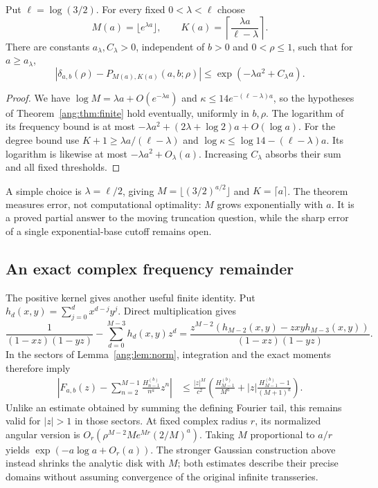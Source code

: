 \begin{theorem}
\label{ang:thm:gaussian}
Put $\ell=\log(3/2)$. For every fixed $0<\lambda<\ell$ choose
\begin{equation}
 M(a)=\lfloor e^{\lambda a}\rfloor,\qquad
 K(a)=\left\lceil\frac{\lambda a}{\ell-\lambda}\right\rceil.
 \label{ang:eq:moving-choice}
\end{equation}
There are constants $a_\lambda,C_\lambda>0$, independent of
$b>0$ and $0<\rho\le1$, such that for $a\ge a_\lambda$,
\begin{equation}
 |\delta_{a,b}(\rho)-P_{M(a),K(a)}(a,b;\rho)|
 \le \exp(-\lambda a^2+C_\lambda a).
 \label{ang:eq:gaussian}
\end{equation}
\end{theorem}
\begin{proof}
We have $\log M=\lambda a+O(e^{-\lambda a})$ and
$\kappa\le14e^{-(\ell-\lambda)a}$, so the hypotheses of
Theorem~\ref{ang:thm:finite} hold eventually, uniformly in
$b,\rho$. The logarithm of its frequency bound is at most
$-\lambda a^2+(2\lambda+\log2)a+O(\log a)$.
For the degree bound use
$K+1\ge\lambda a/(\ell-\lambda)$ and
$\log\kappa\le\log14-(\ell-\lambda)a$.
Its logarithm is likewise at most $-\lambda a^2+O_\lambda(a)$.
Increasing $C_\lambda$ absorbs their sum and all fixed thresholds.
\end{proof}

A simple choice is $\lambda=\ell/2$, giving
$M=\lfloor(3/2)^{a/2}\rfloor$ and $K=\lceil a\rceil$.
The theorem measures error, not computational optimality: $M$ grows
exponentially with $a$. It is a proved partial answer to the moving
truncation question, while the sharp error of a single
exponential-base cutoff remains open.

\subsection{An exact complex frequency remainder}

The positive kernel gives another useful finite identity. Put
$h_d(x,y)=\sum_{j=0}^d x^{d-j}y^j$. Direct multiplication gives
\begin{equation}
 \frac1{(1-xz)(1-yz)}-\sum_{d=0}^{M-3}h_d(x,y)z^d
 =\frac{z^{M-2}(h_{M-2}(x,y)-zxyh_{M-3}(x,y))}
 {(1-xz)(1-yz)}.
 \label{ang:eq:exact-tail}
\end{equation}
In the sectors of Lemma~\ref{ang:lem:norm}, integration and the
exact moments therefore imply
\begin{align}
 \left|F_{a,b}(z)-\sum_{n=2}^{M-1}\frac{H_{n-1}^{(b)}}{n^a}z^n\right|
 &\le\frac{|z|^M}{c^2}
 \left(\frac{H_{M-1}^{(b)}}{M^a}
 +|z|\frac{H_{M-1}^{(b)}-1}{(M+1)^a}\right).
 \label{ang:eq:complex-tail}
\end{align}
Unlike an estimate obtained by summing the defining Fourier tail,
this remains valid for $|z|>1$ in those sectors. At fixed complex
radius $r$, its normalized angular version is
$O_r(\rho^{M-2}M e^{Mr}(2/M)^a)$. Taking $M$ proportional
to $a/r$ yields $\exp(-a\log a+O_r(a))$. The stronger Gaussian
construction above instead shrinks the analytic disk with $M$;
both estimates describe their precise domains without assuming
convergence of the original infinite transseries.
